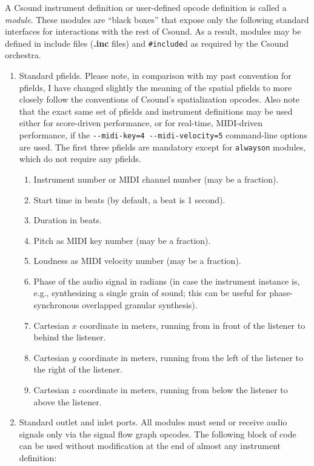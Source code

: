 \documentclass[12pt,letterpaper,onecolumn]{scrartcl}
\begin{document}
A Csound instrument definition or user-defined opcode definition is called a \emph{module}. These modules are ``black boxes'' that expose only the following standard interfaces for interactions with the rest of Csound. As a result, modules may be defined in include files (\textbf{.inc} files) and \texttt{\#include}d as required by the Csound orchestra.

\begin{enumerate}
	\item Standard pfields. Please note, in comparison with my past convention for pfields, I have changed slightly the meaning of the spatial pfields to more closely follow the conventions of Csound's spatialization opcodes. Also note that the exact same set of pfields and instrument definitions may be used either for score-driven performance, or for real-time, MIDI-driven performance, if the \texttt{-\--midi-key=4 -\--midi-velocity=5} command-line options are used. The first three pfields are mandatory except for \texttt{alwayson} modules, which do not require any pfields.
		\begin{enumerate}
			\item Instrument number or MIDI channel number (may be a fraction).
			\item Start time in beats (by default, a beat is 1 second).
			\item Duration in beats.
			\item Pitch as MIDI key number (may be a fraction).
			\item Loudness as MIDI velocity number (may be a fraction).
			\item Phase of the audio signal in radians (in case the instrument instance is, e.g., synthesizing a single grain of sound; this can be useful for phase-synchronous overlapped granular synthesis).
			\item Cartesian $x$ coordinate in meters, running from in front of the listener to behind the listener.
			\item Cartesian $y$ coordinate in meters, running from the left of the listener to the right of the listener.
			\item Cartesian $z$ coordinate in meters, running from below the listener to above the listener.
		\end{enumerate}
	\item Standard outlet and inlet ports. All modules must send or receive audio signals only via the signal flow graph opcodes. The following block of code can be used without modification at the end of almost any instrument definition:
	

\end{enumerate}
\end{document}
